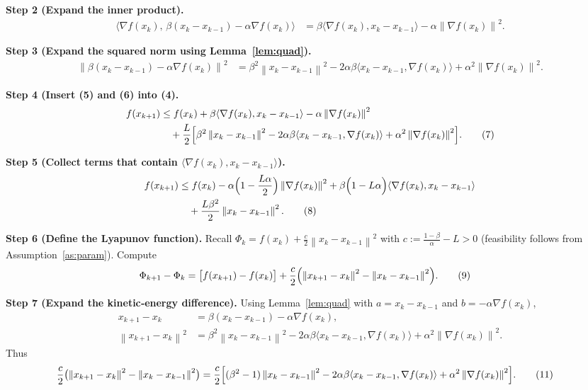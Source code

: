 \documentclass{article}
\newcommand{\norm}[1]{\left\lVert#1\right\rVert}
\begin{document}
\noindent\textbf{Step 2 (Expand the inner product).}
\begin{align}
\bigl\langle\nabla f(x_{k}),\,\beta(x_{k}-x_{k-1})-\alpha\nabla f(x_{k})\bigr\rangle
&= \beta\langle\nabla f(x_{k}),x_{k}-x_{k-1}\rangle-\alpha\norm{\nabla f(x_{k})}^{2}. \tag{5}
\end{align}

\noindent\textbf{Step 3 (Expand the squared norm using Lemma~\ref{lem:quad}).}
\begin{align}
\norm{\beta(x_{k}-x_{k-1})-\alpha\nabla f(x_{k})}^{2}
&= \beta^{2}\norm{x_{k}-x_{k-1}}^{2}
   -2\alpha\beta\langle x_{k}-x_{k-1},\nabla f(x_{k})\rangle
   +\alpha^{2}\norm{\nabla f(x_{k})}^{2}. \tag{6}
\end{align}

\noindent\textbf{Step 4 (Insert (5) and (6) into (4).}
\begin{align}
f(x_{k+1})
&\le f(x_{k})
   +\beta\langle\nabla f(x_{k}),x_{k}-x_{k-1}\rangle
   -\alpha\norm{\nabla f(x_{k})}^{2} \nonumber\\
&\quad+\frac{L}{2}\Bigl[
      \beta^{2}\norm{x_{k}-x_{k-1}}^{2}
      -2\alpha\beta\langle x_{k}-x_{k-1},\nabla f(x_{k})\rangle
      +\alpha^{2}\norm{\nabla f(x_{k})}^{2}
   \Bigr]. \tag{7}
\end{align}

\noindent\textbf{Step 5 (Collect terms that contain $\langle\nabla f(x_{k}),x_{k}-x_{k-1}\rangle$).}
\begin{align}
f(x_{k+1})
&\le f(x_{k})
   -\alpha\Bigl(1-\frac{L\alpha}{2}\Bigr)\norm{\nabla f(x_{k})}^{2}
   +\beta\Bigl(1-L\alpha\Bigr)\langle\nabla f(x_{k}),x_{k}-x_{k-1}\rangle \nonumber\\
&\quad+\frac{L\beta^{2}}{2}\norm{x_{k}-x_{k-1}}^{2}. \tag{8}
\end{align}

\noindent\textbf{Step 6 (Define the Lyapunov function).}  
Recall $\Phi_{k}=f(x_{k})+\frac{c}{2}\norm{x_{k}-x_{k-1}}^{2}$ with $c:=\frac{1-\beta}{\alpha}-L>0$ (feasibility follows from Assumption~\ref{as:param}). Compute
\begin{align}
\Phi_{k+1}-\Phi_{k}
&= \bigl[f(x_{k+1})-f(x_{k})\bigr]
   +\frac{c}{2}\Bigl(\norm{x_{k+1}-x_{k}}^{2}-\norm{x_{k}-x_{k-1}}^{2}\Bigr). \tag{9}
\end{align}

\noindent\textbf{Step 7 (Expand the kinetic‑energy difference).}
Using Lemma~\ref{lem:quad} with $a=x_{k}-x_{k-1}$ and $b=-\alpha\nabla f(x_{k})$,
\begin{align}
x_{k+1}-x_{k}&=\beta(x_{k}-x_{k-1})-\alpha\nabla f(x_{k}),\\
\norm{x_{k+1}-x_{k}}^{2}
&= \beta^{2}\norm{x_{k}-x_{k-1}}^{2}
   -2\alpha\beta\langle x_{k}-x_{k-1},\nabla f(x_{k})\rangle
   +\alpha^{2}\norm{\nabla f(x_{k})}^{2}. \tag{10}
\end{align}
Thus
\begin{align}
\frac{c}{2}\bigl(\norm{x_{k+1}-x_{k}}^{2}-\norm{x_{k}-x_{k-1}}^{2}\bigr)
&= \frac{c}{2}\Bigl[(\beta^{2}-1)\norm{x_{k}-x_{k-1}}^{2}
   -2\alpha\beta\langle x_{k}-x_{k-1},\nabla f(x_{k})\rangle
   +\alpha^{2}\norm{\nabla f(x_{k})}^{2}\Bigr]. \tag{11}
\end{align}
\end{document}
